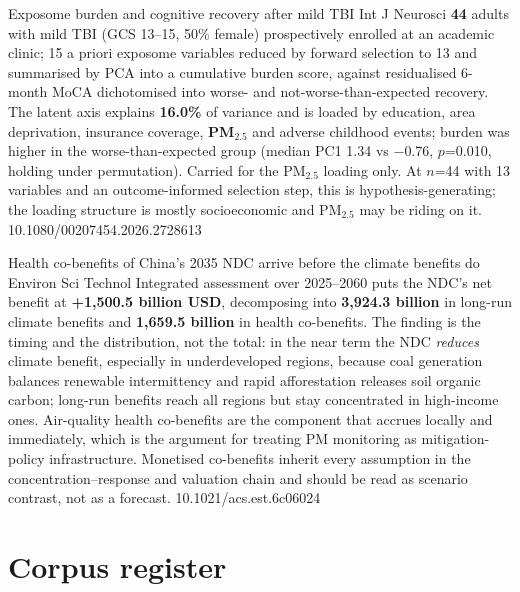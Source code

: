 \documentclass[10pt]{article}
\begin{document}

{Exposome burden and cognitive recovery after mild TBI}
{Int J Neurosci}
{\textbf{44} adults with mild TBI (GCS 13--15, 50\% female) prospectively enrolled at an
academic clinic; 15 a priori exposome variables reduced by forward selection to 13 and
summarised by PCA into a cumulative burden score, against residualised 6-month MoCA
dichotomised into worse- and not-worse-than-expected recovery. The latent axis explains
\textbf{16.0\%} of variance and is loaded by education, area deprivation, insurance
coverage, \textbf{PM$_{2.5}$} and adverse childhood events; burden was higher in the
worse-than-expected group (median PC1 1.34 vs $-$0.76, $p$=0.010, holding under
permutation). Carried for the PM$_{2.5}$ loading only. At $n$=44 with 13 variables and an
outcome-informed selection step, this is hypothesis-generating; the loading structure is
mostly socioeconomic and PM$_{2.5}$ may be riding on it.}
{10.1080/00207454.2026.2728613}


{Health co-benefits of China's 2035 NDC arrive before the climate benefits do}
{Environ Sci Technol}
{Integrated assessment over 2025--2060 puts the NDC's net benefit at \textbf{+1{,}500.5
billion USD}, decomposing into \textbf{3{,}924.3 billion} in long-run climate benefits and
\textbf{1{,}659.5 billion} in health co-benefits. The finding is the timing and the
distribution, not the total: in the near term the NDC \emph{reduces} climate benefit,
especially in underdeveloped regions, because coal generation balances renewable
intermittency and rapid afforestation releases soil organic carbon; long-run benefits reach
all regions but stay concentrated in high-income ones. Air-quality health co-benefits are
the component that accrues locally and immediately, which is the argument for treating PM
monitoring as mitigation-policy infrastructure. Monetised co-benefits inherit every
assumption in the concentration--response and valuation chain and should be read as
scenario contrast, not as a forecast.}
{10.1021/acs.est.6c06024}

\clearpage

\section*{\sffamily\bfseries\color{Deep}Corpus register}
\vspace{-1.5mm}{\color{Amber}\rule{\linewidth}{1.1pt}}\vspace{2.5mm}
\end{document}
